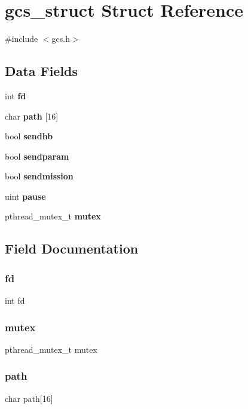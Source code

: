 \section{gcs\+\_\+struct Struct Reference}
\label{structgcs__struct}


{\ttfamily \#include $<$gcs.\+h$>$}

\subsection*{Data Fields}
\begin{DoxyCompactItemize}
\item 
int \textbf{ fd}
\item 
char \textbf{ path} [16]
\item 
bool \textbf{ sendhb}
\item 
bool \textbf{ sendparam}
\item 
bool \textbf{ sendmission}
\item 
uint \textbf{ pause}
\item 
pthread\+\_\+mutex\+\_\+t \textbf{ mutex}
\end{DoxyCompactItemize}


\subsection{Field Documentation}
\mbox{\label{structgcs__struct_a6f8059414f0228f0256115e024eeed4b}} 
\subsubsection{fd}
{\footnotesize\ttfamily int fd}

\mbox{\label{structgcs__struct_a4acff8232e4aec9cd5c6dc200ac55ef3}} 
\subsubsection{mutex}
{\footnotesize\ttfamily pthread\+\_\+mutex\+\_\+t mutex}

\mbox{\label{structgcs__struct_ace45f567511d3f9ff978c679ae38b5b0}} 
\subsubsection{path}
{\footnotesize\ttfamily char path[16]}

